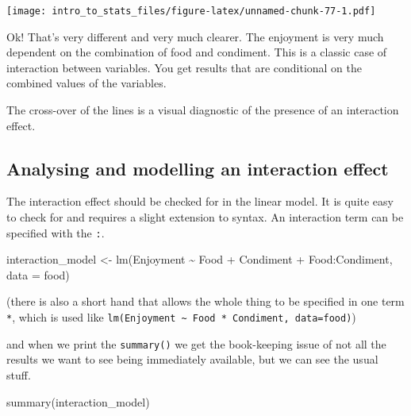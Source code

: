 \documentclass[
]{book}
\newenvironment{Shaded}{\begin{snugshade}}{\end{snugshade}}
\newcommand{\AttributeTok}[1]{\textcolor[rgb]{0.77,0.63,0.00}{#1}}
\newcommand{\FunctionTok}[1]{\textcolor[rgb]{0.00,0.00,0.00}{#1}}
\newcommand{\NormalTok}[1]{#1}
\newcommand{\OtherTok}[1]{\textcolor[rgb]{0.56,0.35,0.01}{#1}}
\newcommand{\SpecialCharTok}[1]{\textcolor[rgb]{0.00,0.00,0.00}{#1}}
\newenvironment{sidenote}
{ \begin{tcolorbox}[colbacktitle=blue!50!white,
title=huh?,coltitle=white,
fonttitle=\bfseries] }
{  \end{tcolorbox} }
\begin{document}
\texttt{[image: intro\_to\_stats\_files/figure-latex/unnamed-chunk-77-1.pdf]}

Ok! That's very different and very much clearer. The enjoyment is very much dependent on the combination of food and condiment. This is a classic case of interaction between variables. You get results that are conditional on the combined values of the variables.

\begin{sidenote}
The cross-over of the lines is a visual diagnostic of the presence of an interaction effect.
\end{sidenote}

\hypertarget{analysing-and-modelling-an-interaction-effect}{%
\subsection{Analysing and modelling an interaction effect}\label{analysing-and-modelling-an-interaction-effect}}

The interaction effect should be checked for in the linear model. It is quite easy to check for and requires a slight extension to syntax. An interaction term can be specified with the \texttt{:}.

\begin{Shaded}
\begin{Highlighting}[]
\NormalTok{interaction\_model }\OtherTok{\textless{}{-}} \FunctionTok{lm}\NormalTok{(Enjoyment }\SpecialCharTok{\textasciitilde{}}\NormalTok{ Food }\SpecialCharTok{+}\NormalTok{ Condiment }\SpecialCharTok{+}\NormalTok{ Food}\SpecialCharTok{:}\NormalTok{Condiment, }\AttributeTok{data =}\NormalTok{ food)}
\end{Highlighting}
\end{Shaded}

(there is also a short hand that allows the whole thing to be specified in one term \texttt{*}, which is used like \texttt{lm(Enjoyment\ \textasciitilde{}\ Food\ *\ Condiment,\ data=food)})

and when we print the \texttt{summary()} we get the book-keeping issue of not all the results we want to see being immediately available, but we can see the usual stuff.

\begin{Shaded}
\begin{Highlighting}[]
\FunctionTok{summary}\NormalTok{(interaction\_model)}
\end{Highlighting}
\end{Shaded}
\end{document}
